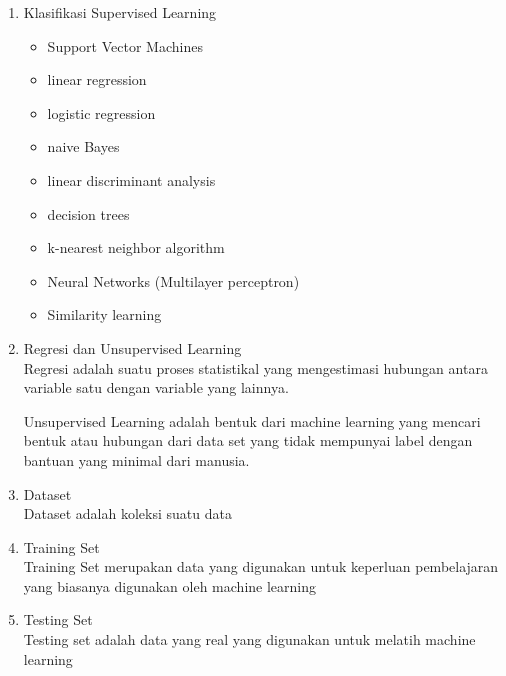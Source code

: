 \begin{enumerate}
\item Klasifikasi Supervised Learning
\begin{itemize}
\item Support Vector Machines
\item linear regression
\item logistic regression
\item naive Bayes
\item linear discriminant analysis
\item decision trees
\item k-nearest neighbor algorithm
\item Neural Networks (Multilayer perceptron)
\item Similarity learning
\end{itemize}

\item Regresi dan Unsupervised Learning\\
Regresi adalah suatu proses statistikal yang mengestimasi hubungan antara variable satu dengan variable yang lainnya.

Unsupervised Learning adalah bentuk dari machine learning yang mencari bentuk atau hubungan dari data set yang tidak mempunyai label dengan bantuan yang minimal dari manusia.

\item Dataset\\
Dataset adalah koleksi suatu data

\item Training Set\\
Training Set merupakan data yang digunakan untuk keperluan pembelajaran yang biasanya digunakan oleh machine learning

\item Testing Set\\
Testing set adalah data yang real yang digunakan untuk melatih machine learning

\end{enumerate}

